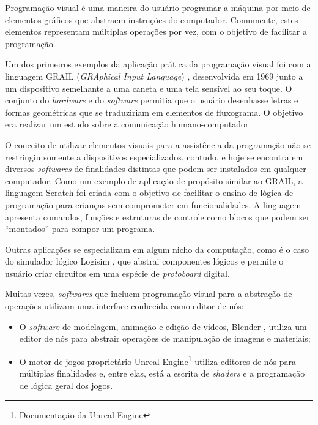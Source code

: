 \documentclass[
	12pt,				%
	openright,			%
	oneside,			%
	a4paper,			%
	main=brazil,
	english,			%
	]{ufsj-abntex2}
\begin{document}
Programação visual é uma maneira do usuário programar a máquina por meio de elementos gráficos que abstraem instruções do computador. Comumente, estes elementos representam múltiplas operações por vez, com o objetivo de facilitar a programação.

Um dos primeiros exemplos da aplicação prática da programação visual foi com a linguagem GRAIL (\textit{GRAphical Input Language}) \cite{grail}, desenvolvida em 1969 junto a um dispositivo semelhante a uma caneta e uma tela sensível ao seu toque. O conjunto do \textit{hardware} e do \textit{software} permitia que o usuário desenhasse letras e formas geométricas que se traduziriam em elementos de fluxograma. O objetivo era realizar um estudo sobre a comunicação humano-computador.

O conceito de utilizar elementos visuais para a assistência da programação não se restringiu somente a dispositivos especializados, contudo, e hoje se encontra em diversos \textit{softwares} de finalidades distintas que podem ser instalados em qualquer computador. Como um exemplo de aplicação de propósito similar ao GRAIL, a linguagem Scratch \cite{scratchlang} foi criada com o objetivo de facilitar o ensino de lógica de programação para crianças sem comprometer em funcionalidades. A linguagem apresenta comandos, funções e estruturas de controle como blocos que podem ser ``montados'' para compor um programa.

Outras aplicações se especializam em algum nicho da computação, como é o caso do simulador lógico Logisim \cite{logisim}, que abstrai componentes lógicos e permite o usuário criar circuitos em uma espécie de \textit{protoboard} digital.

Muitas vezes, \textit{softwares} que incluem programação visual para a abstração de operações utilizam uma interface conhecida como editor de nós:

\begin{itemize}
    \item O \textit{software} de modelagem, animação e edição de vídeos, Blender \cite{blender}, utiliza um editor de nós para abstrair operações de manipulação de imagens e materiais;

    \item O motor de jogos proprietário Unreal Engine\footnote{\href{https://www.unrealengine.com/}{Documentação da Unreal Engine}} utiliza editores de nós para múltiplas finalidades e, entre elas, está a escrita de \textit{shaders} e a programação de lógica geral dos jogos.
\end{itemize}
\end{document}
